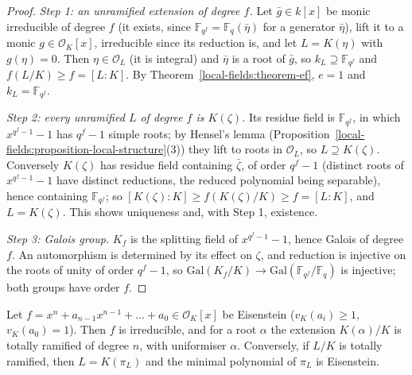 \begin{proof}
\emph{Step 1: an unramified extension of degree $f$.} Let $\bar g \in k[x]$ be monic irreducible of degree $f$ (it exists, since $\mathbb{F}_{q^f} = \mathbb{F}_q(\bar\eta)$ for a generator $\bar\eta$), lift it to a
monic $g \in \mathcal{O}_K[x]$, irreducible since its reduction is, and let $L = K(\eta)$ with $g(\eta) = 0$. Then $\eta \in \mathcal{O}_L$ (it is integral) and $\bar\eta$ is a root of $\bar g$, so
$k_L \supseteq \mathbb{F}_{q^f}$ and $f(L/K) \geq f = [L : K]$. By Theorem~\ref{local-fields:theorem-ef}, $e = 1$ and $k_L = \mathbb{F}_{q^f}$.

\emph{Step 2: every unramified $L$ of degree $f$ is $K(\zeta)$.} Its residue field is $\mathbb{F}_{q^f}$, in which $x^{q^f - 1} - 1$ has $q^f - 1$ simple roots; by Hensel's lemma
(Proposition~\ref{local-fields:proposition-local-structure}(3)) they lift to roots in $\mathcal{O}_L$, so $L \supseteq K(\zeta)$. Conversely $K(\zeta)$ has residue field containing $\bar\zeta$, of order $q^f - 1$
(distinct roots of $x^{q^f-1} - 1$ have distinct reductions, the reduced polynomial being separable), hence containing $\mathbb{F}_{q^f}$; so $[K(\zeta) : K] \geq f(K(\zeta)/K) \geq f = [L : K]$, and $L = K(\zeta)$.
This shows uniqueness and, with Step 1, existence.

\emph{Step 3: Galois group.} $K_f$ is the splitting field of $x^{q^f - 1} - 1$, hence Galois of degree $f$. An automorphism is determined by its effect on $\zeta$, and reduction is injective on the roots of
unity of order $q^f - 1$, so $\mathrm{Gal}(K_f/K) \to \mathrm{Gal}(\mathbb{F}_{q^f}/\mathbb{F}_q)$ is injective; both groups have order $f$.
\end{proof}

\begin{proposition}\label{local-fields:proposition-eisenstein}
Let $f = x^n + a_{n-1}x^{n-1} + \dots + a_0 \in \mathcal{O}_K[x]$ be Eisenstein ($v_K(a_i) \geq 1$, $v_K(a_0) = 1$). Then $f$ is irreducible, and for a root $\alpha$ the extension $K(\alpha)/K$ is totally ramified of
degree $n$, with uniformiser $\alpha$. Conversely, if $L/K$ is totally ramified, then $L = K(\pi_L)$ and the minimal polynomial of $\pi_L$ is Eisenstein.
\end{proposition}

